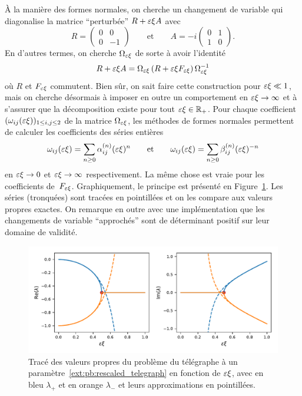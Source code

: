À la manière des formes normales, on cherche un changement de variable qui diagonalise la matrice \enquote{perturbée} $R + \varepsilon\xi A$ avec
\begin{equation*}
    R = \begin{pmatrix}
        0 & 0 \\ 0 & -1
    \end{pmatrix}
    \qquad \text{et} \qquad
    A = -i \begin{pmatrix}
        0 & 1 \\ 1 & 0
    \end{pmatrix} .
\end{equation*}
En d'autres termes, on cherche $\Omega_{\varepsilon\xi}$ de sorte à avoir l'identité 
\begin{equation}
    R + \varepsilon\xi A = \Omega _{\varepsilon\xi} \left(R + {\varepsilon\xi} F_{\varepsilon\xi} \right) \Omega_{\varepsilon\xi}^{-1}
\end{equation}
où $R$ et $F_{\varepsilon\xi}$ commutent. Bien sûr, on sait faire cette construction pour $\varepsilon\xi \ll 1$, mais on cherche désormais à imposer en outre un comportement en $\varepsilon\xi \rightarrow \infty$ et à s'assurer que la décomposition existe pour tout $\varepsilon\xi \in \mathbb{R}_+$. Pour chaque coefficient $(\omega_{ij}(\varepsilon\xi))_{1 \leq i,j \leq 2}$ de la matrice $\Omega_{\varepsilon\xi}$, les méthodes de formes normales permettent de calculer les coefficients des séries entières 
\begin{equation*}
    \omega_{ij}(\varepsilon\xi) 
    = \sum_{n \geq 0} \alpha_{ij}^{(n)} (\varepsilon\xi)^n
    \qquad \text{et} \qquad
    \omega_{ij}(\varepsilon\xi) 
    = \sum_{n \geq 0} \beta_{ij}^{(n)} (\varepsilon\xi)^{-n} 
\end{equation*}
en $\varepsilon\xi \rightarrow 0$ et $\varepsilon\xi \rightarrow \infty$ respectivement. La même chose est vraie pour les coefficients de~$F_{\varepsilon\xi}$. Graphiquement, le principe est présenté en Figure~\ref{ext:fig:telegraph_eig}. Les séries (tronquées) sont tracées en pointillées et on les compare aux valeurs propres exactes. On remarque en outre avec une implémentation que les changements de variable \enquote{approchés} sont de déterminant positif sur leur domaine de validité.
%
\begin{figure}[!h]
    \centering
    \includegraphics[width=.95\textwidth]{./Discussion/telegraph_eigenvalues.pdf}
    \caption{Tracé des valeurs propres du problème du télégraphe à un paramètre~\eqref{ext:pb:rescaled_telegraph} en fonction de $\varepsilon\xi$, avec en bleu $\lambda_+$ et en orange $\lambda_-$ et leurs approximations en pointillées.}
    \label{ext:fig:telegraph_eig}
\end{figure}

